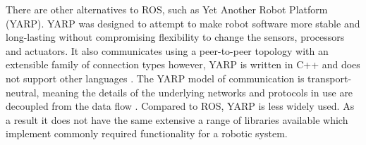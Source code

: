 There are other alternatives to ROS, such as Yet Another Robot Platform 
(YARP). YARP was designed to attempt to make robot software more stable 
and long-lasting without compromising flexibility to change the sensors, 
processors and actuators. It also communicates using a peer-to-peer 
topology with an extensible family of connection types however, YARP is 
written in C++ and does not support other languages \cite{aboutYARP}.
The YARP model of communication is transport-neutral, meaning the details 
of the underlying networks and protocols in use are decoupled from the 
data flow \cite{exactlyIsYARP}. Compared to ROS, YARP is less widely used.
As a result it does not have the same extensive a range of libraries available 
which implement commonly required functionality for a robotic system.


